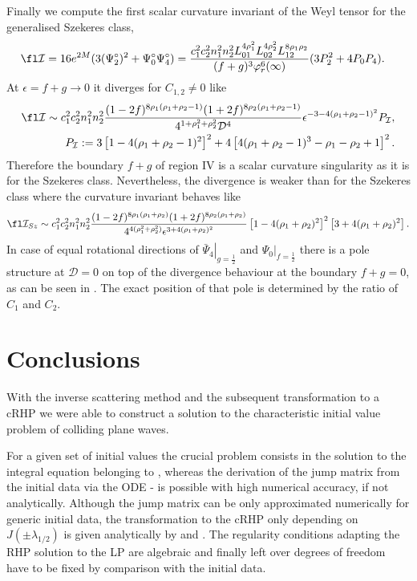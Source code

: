 \documentclass[12pt]{iopart}
\begin{document}
Finally we compute the first scalar curvature invariant of the Weyl tensor for the generalised Szekeres class,
\begin{eqnarray}
\fl \mathcal{I}&=16e^{2M}(3(\Psi_2^{\circ})^2+\Psi_0^{\circ}\Psi_4^{\circ}) 
=\frac{c_1^2 c_2^2 n_1^2 n_2^2 L_{01}^{4 \rho_1^2}L_{02}^{4 \rho_2^2} L_{12}^{8 \rho_1 \rho_2}}{(f+g)^3\varphi_{r}^6(\infty)}(3P_2^2+4P_0P_4).
\end{eqnarray}
At $\epsilon=f+g\to 0$ it diverges for $C_{1,2}\neq 0$ like
\begin{eqnarray}
\fl\mathcal{I}\sim c_1^2 c_2^2 n_1^2 n_2^2 \frac{(1-2f)^{8\rho_1(\rho_1+\rho_2-1)}(1+2f)^{8\rho_2(\rho_1+\rho_2-1)}}{4^{1+\rho_1^2+\rho_2^2}\mathcal{D}^4}\epsilon^{-3-4(\rho_1+\rho_2-1)^2}P_{\mathcal{I}}, \\
P_{\mathcal{I}}:=3 \left[1-4 (\rho_1+\rho_2-1)^2\right]^2+4 \left[4 (\rho_1+\rho_2-1)^3-\rho_1-\rho_2+1\right]^2.
\end{eqnarray}
Therefore the boundary $f+g$ of region IV is a scalar curvature singularity as it is for the Szekeres class. Nevertheless, the divergence is weaker than for the Szekeres class where the curvature invariant behaves like
\begin{eqnarray}
\fl\mathcal{I}_{Sz}\sim c_1^2 c_2^2 n_1^2 n_2^2\frac{(1-2f)^{8\rho_1(\rho_1+\rho_2)}(1+2f)^{8\rho_2(\rho_1+\rho_2)}}{4^{4(\rho_1^2+\rho_2^2)}\epsilon^{3+4(\rho_1+\rho_2)^2}}\left[1-4(\rho_1+\rho_2)^2\right]^2\left[3+4(\rho_1+\rho_2)^2\right].\nonumber
\end{eqnarray}
In case of equal rotational directions of $\left.\bar{\Psi}_4\right\vert_{g=\frac12}$ and $\left.\Psi_0\right\vert_{f=\frac12}$ there is a pole structure at $\mathcal{D}=0$ on top of the divergence behaviour at the boundary $f+g=0$, as can be seen in . The exact position of that pole is determined by the ratio of $C_1$ and $C_2$.

\section{Conclusions}

With the inverse scattering method and the subsequent transformation to a cRHP we were able to construct a solution to the characteristic initial value problem of colliding plane waves. 

For a given set of initial values the crucial problem consists in the solution to the integral equation belonging to , whereas the derivation of the jump matrix from the initial data via the ODE - is possible with high numerical accuracy, if not analytically. Although the jump matrix can be only approximated numerically for generic initial data, the transformation to the cRHP only depending on $J(\pm\lambda_{1/2})$ is given analytically by  and . The regularity conditions  adapting the RHP solution to the LP are algebraic and finally left over degrees of freedom have to be fixed by comparison with the initial data. 
\end{document}
